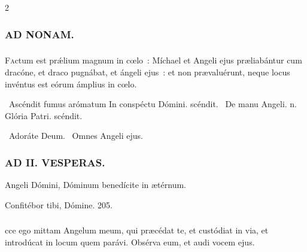 \documentclass[9pt,twoside]{extarticle}
\begin{document}
\begin{multicols}{2}
{{{\subsubsection*{\center \textsc{AD NONAM.}}
\subsubsection*{}
\lettrine{F}actum est prǽlium magnum in cœlo~: Míchael et Angeli ejus præliabántur cum dracóne, et draco pugnábat, et ángeli ejus~: et non prævaluérunt, neque locus invéntus est eórum ámplius in cœlo.

\begin{tightlist}{}
\item {}~Ascéndit fumus arómatum \textred{*} In conspéctu Dómini. scéndit. ~De manu Angeli. n. Glória Patri. scéndit.
\item {}~Adoráte Deum. ~Omnes Angeli ejus.
\end{tightlist}

\subsubsection*{\center \textsc{AD II. VESPERAS.}}
\begin{tightlist}{}
\item {} Angeli Dómini, Dóminum benedícite in ætérnum. 
\item {} Confitébor tibi, Dómine. 205.
\end{tightlist}

\subsubsection*{}
cce ego mittam Angelum meum, qui præcédat te, et custódiat in via, et introdúcat in locum quem parávi. Obsérva eum, et audi vocem ejus.

}}}
\end{multicols}
\end{document}
